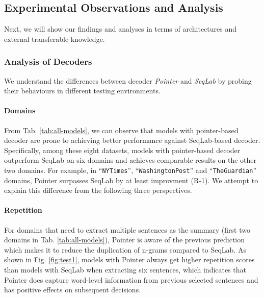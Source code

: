 \documentclass[11pt,a4paper]{article}
\begin{document}
\subsection{Experimental Observations and Analysis}

Next, we will show our findings and analyses in terms of architectures and external transferable knowledge.


\subsubsection{Analysis of Decoders} \label{exp:decoder}
We understand the differences between decoder \textit{Pointer} and \textit{SeqLab}  by probing their behaviours in different testing environments.

\paragraph{Domains}
From Tab. \ref{tab:all-models}, we can observe that models with pointer-based decoder are prone to achieving better performance against SeqLab-based decoder. Specifically, among these eight datasets, models with pointer-based decoder outperform SeqLab on six domains and achieves comparable results on the other two domains.
For example, in ``\texttt{NYTimes}'', ``\texttt{WashingtonPost}'' and ``\texttt{TheGuardian}'' domains, Pointer surpasses SeqLab by at least  improvment (R-1). We attempt to explain this difference from the following three perspectives.


\paragraph{Repetition} For domains that need to extract multiple sentences as the summary (first two domains in Tab. \ref{tab:all-models}), Pointer is aware of the previous prediction which makes it to reduce the duplication of n-grams compared to SeqLab. As shown in Fig. \ref{fig:test1}, models with Pointer always get higher repetition scores than models with SeqLab when extracting six sentences, which indicates that Pointer does capture word-level information from previous selected sentences and has positive effects on subsequent decisions.
\end{document}
